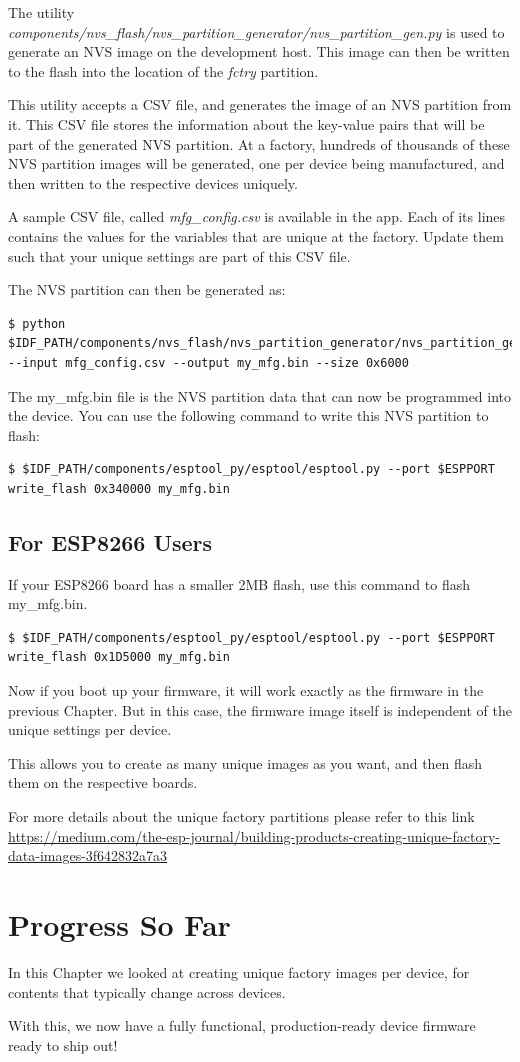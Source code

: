 \documentclass[main.tex]{subfiles}
\begin{document}
The utility \textit{components/nvs\_flash/nvs\_partition\_generator/nvs\_partition\_gen.py} is used to generate an NVS image on the development host. This image can then be written to the flash into the location of the \textit{fctry} partition.

This utility accepts a CSV file, and generates the image of an NVS partition from it. This CSV file stores the information about the key-value pairs that will be part of the generated NVS partition. At a factory, hundreds of thousands of these NVS partition images will be generated, one per device being manufactured, and then written to the respective devices uniquely.

A sample CSV file, called \textit{mfg\_config.csv} is available in the app. Each of its lines contains the values for the variables that are unique at the factory.
Update them such that your unique settings are part of this CSV file.

The NVS partition can then be generated as:
\begin{verbatim}
$ python $IDF_PATH/components/nvs_flash/nvs_partition_generator/nvs_partition_gen.py --input mfg_config.csv --output my_mfg.bin --size 0x6000
\end{verbatim}

The my\_mfg.bin file is the NVS partition data that can now be programmed into the device. You can use the following command to write this NVS partition to flash:
\begin{verbatim}
$ $IDF_PATH/components/esptool_py/esptool/esptool.py --port $ESPPORT write_flash 0x340000 my_mfg.bin
\end{verbatim}

\subsection{For ESP8266 Users}\label{sec:for_esp8266_users}
If your ESP8266 board has a smaller 2MB flash, use this command to flash my_mfg.bin.
\begin{verbatim}
$ $IDF_PATH/components/esptool_py/esptool/esptool.py --port $ESPPORT write_flash 0x1D5000 my_mfg.bin
\end{verbatim}

Now if you boot up your firmware, it will work exactly as the firmware in the previous Chapter. But in this case, the firmware image itself is independent of the unique settings per device. 

This allows you to create as many unique images as you want, and then flash them on the respective boards.

For more details about the unique factory partitions please refer to this link \url{https://medium.com/the-esp-journal/building-products-creating-unique-factory-data-images-3f642832a7a3}

\section{Progress So Far}
In this Chapter we looked at creating unique factory images per device, for contents that typically change across devices.

With this, we now have a fully functional, production-ready device firmware ready to ship out!
\end{document}
